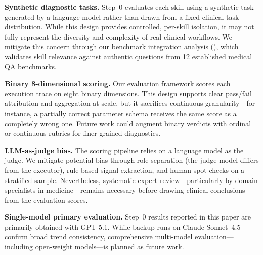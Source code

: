 \label{sec:limitations}

\noindent
\textbf{Synthetic diagnostic tasks.}\quad
Step~0 evaluates each skill using a synthetic task generated by a language model rather than drawn from a fixed clinical task distribution.
While this design provides controlled, per-skill isolation, it may not fully represent the diversity and complexity of real clinical workflows.
We mitigate this concern through our benchmark integration analysis (), which validates skill relevance against authentic questions from 12 established medical QA benchmarks.

\textbf{Binary 8-dimensional scoring.}\quad
Our evaluation framework scores each execution trace on eight binary dimensions.
This design supports clear pass/fail attribution and aggregation at scale, but it sacrifices continuous granularity---for instance, a partially correct parameter schema receives the same score as a completely wrong one.
Future work could augment binary verdicts with ordinal or continuous rubrics for finer-grained diagnostics.

\textbf{LLM-as-judge bias.}\quad
The scoring pipeline relies on a language model as the judge.
We mitigate potential bias through role separation (the judge model differs from the executor), rule-based signal extraction, and human spot-checks on a stratified sample.
Nevertheless, systematic expert review---particularly by domain specialists in medicine---remains necessary before drawing clinical conclusions from the evaluation scores.

\textbf{Single-model primary evaluation.}\quad
Step~0 results reported in this paper are primarily obtained with GPT-5.1.
While backup runs on Claude Sonnet~4.5 confirm broad trend consistency, comprehensive multi-model evaluation---including open-weight models---is planned as future work.
